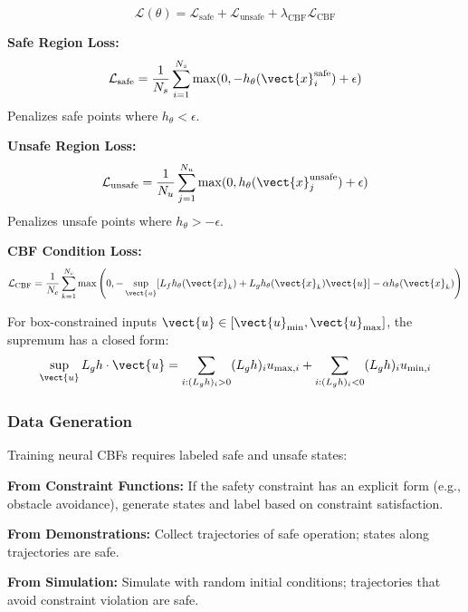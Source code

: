 \begin{equation}
\mathcal{L}(\theta) = \mathcal{L}_{\text{safe}} + \mathcal{L}_{\text{unsafe}} + \lambda_{\text{CBF}} \mathcal{L}_{\text{CBF}}
\label{eq:ncbf_loss}
\end{equation}

\textbf{Safe Region Loss:}
\begin{equation}
\mathcal{L}_{\text{safe}} = \frac{1}{N_s} \sum_{i=1}^{N_s} \max(0, -h_\theta(\vect{x}_i^{\text{safe}}) + \epsilon)
\end{equation}
Penalizes safe points where $h_\theta < \epsilon$.

\textbf{Unsafe Region Loss:}
\begin{equation}
\mathcal{L}_{\text{unsafe}} = \frac{1}{N_u} \sum_{j=1}^{N_u} \max(0, h_\theta(\vect{x}_j^{\text{unsafe}}) + \epsilon)
\end{equation}
Penalizes unsafe points where $h_\theta > -\epsilon$.

\textbf{CBF Condition Loss:}
\begin{equation}
\mathcal{L}_{\text{CBF}} = \frac{1}{N_c} \sum_{k=1}^{N_c} \max\left(0, -\sup_{\vect{u}} [L_f h_\theta(\vect{x}_k) + L_g h_\theta(\vect{x}_k)\vect{u}] - \alpha h_\theta(\vect{x}_k)\right)
\end{equation}

For box-constrained inputs $\vect{u} \in [\vect{u}_{\min}, \vect{u}_{\max}]$, the supremum has a closed form:
\begin{equation}
\sup_{\vect{u}} L_g h \cdot \vect{u} = \sum_{i: (L_g h)_i > 0} (L_g h)_i u_{\max,i} + \sum_{i: (L_g h)_i < 0} (L_g h)_i u_{\min,i}
\label{eq:sup_closed_form}
\end{equation}

\subsubsection{Data Generation}

Training neural CBFs requires labeled safe and unsafe states:

\textbf{From Constraint Functions:} If the safety constraint has an explicit form (e.g., obstacle avoidance), generate states and label based on constraint satisfaction.

\textbf{From Demonstrations:} Collect trajectories of safe operation; states along trajectories are safe.

\textbf{From Simulation:} Simulate with random initial conditions; trajectories that avoid constraint violation are safe.

